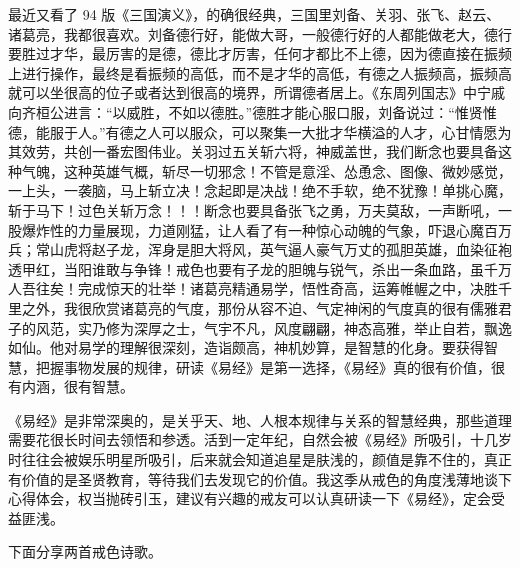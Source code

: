 最近又看了 94 版《三国演义》，的确很经典，三国里刘备、关羽、张飞、赵云、诸葛亮，我都很喜欢。刘备德行好，能做大哥，一般德行好的人都能做老大，德行要胜过才华，最厉害的是德，德比才厉害，任何才都比不上德，因为德直接在振频上进行操作，最终是看振频的高低，而不是才华的高低，有德之人振频高，振频高就可以坐很高的位子或者达到很高的境界，所谓德者居上。《东周列国志》中宁戚向齐桓公进言：“以威胜，不如以德胜。”德胜才能心服口服，刘备说过：“惟贤惟德，能服于人。”有德之人可以服众，可以聚集一大批才华横溢的人才，心甘情愿为其效劳，共创一番宏图伟业。关羽过五关斩六将，神威盖世，我们断念也要具备这种气魄，这种英雄气概，斩尽一切邪念！不管是意淫、怂恿念、图像、微妙感觉，一上头，一袭脑，马上斩立决！念起即是决战！绝不手软，绝不犹豫！单挑心魔，斩于马下！过色关斩万念！！！断念也要具备张飞之勇，万夫莫敌，一声断吼，一股爆炸性的力量展现，力道刚猛，让人看了有一种惊心动魄的气象，吓退心魔百万兵；常山虎将赵子龙，浑身是胆大将风，英气逼人豪气万丈的孤胆英雄，血染征袍透甲红，当阳谁敢与争锋！戒色也要有子龙的胆魄与锐气，杀出一条血路，虽千万人吾往矣！完成惊天的壮举！诸葛亮精通易学，悟性奇高，运筹帷幄之中，决胜千里之外，我很欣赏诸葛亮的气度，那份从容不迫、气定神闲的气度真的很有儒雅君子的风范，实乃修为深厚之士，气宇不凡，风度翩翩，神态高雅，举止自若，飘逸如仙。他对易学的理解很深刻，造诣颇高，神机妙算，是智慧的化身。要获得智慧，把握事物发展的规律，研读《易经》是第一选择，《易经》真的很有价值，很有内涵，很有智慧。

《易经》是非常深奥的，是关乎天、地、人根本规律与关系的智慧经典，那些道理需要花很长时间去领悟和参透。活到一定年纪，自然会被《易经》所吸引，十几岁时往往会被娱乐明星所吸引，后来就会知道追星是肤浅的，颜值是靠不住的，真正有价值的是圣贤教育，等待我们去发现它的价值。我这季从戒色的角度浅薄地谈下心得体会，权当抛砖引玉，建议有兴趣的戒友可以认真研读一下《易经》，定会受益匪浅。

下面分享两首戒色诗歌。

